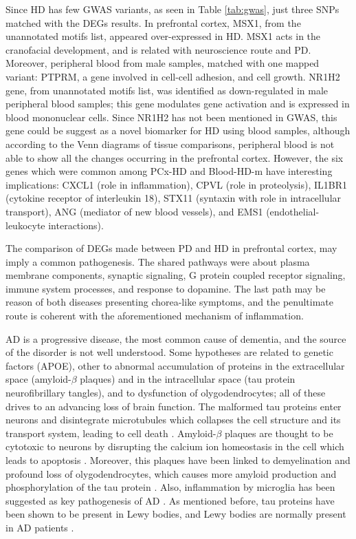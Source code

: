 Since HD has few GWAS variants, as seen in Table \ref{tab:gwas}, just three SNPs matched with the DEGs results. In prefrontal cortex, MSX1, from the unannotated motifs list, appeared over-expressed in HD. MSX1 acts in the cranofacial development, and is related with neuroscience route and PD. Moreover, peripheral blood from male samples, matched with one mapped variant: PTPRM, a gene involved in cell-cell adhesion, and cell growth. NR1H2 gene, from unannotated motifs list, was identified as down-regulated in male peripheral blood samples; this gene modulates gene activation and is expressed in blood mononuclear cells. Since NR1H2 has not been mentioned in GWAS, this gene could be suggest as a novel biomarker for HD using blood samples, although according to the Venn diagrams of tissue comparisons, peripheral blood is not able to show all the changes occurring in the prefrontal cortex. However, the six genes which were common among PCx-HD and Blood-HD-m have interesting implications: CXCL1 (role in inflammation), CPVL (role in proteolysis), IL1BR1 (cytokine receptor of interleukin 18), STX11 (syntaxin with role in intracellular transport), ANG (mediator of new blood vessels), and EMS1 (endothelial-leukocyte interactions).

The comparison of DEGs made between PD and HD in prefrontal cortex, may imply a common pathogenesis. The shared pathways were about plasma membrane components, synaptic signaling, G protein coupled receptor signaling, immune system processes, and response to dopamine. The last path may be reason of both diseases presenting chorea-like symptoms, and the penultimate route is coherent with the aforementioned mechanism of inflammation. 

AD is a progressive disease, the most common cause of dementia, and the source of the disorder is not well understood. Some hypotheses are related to genetic factors (APOE), other to abnormal accumulation of proteins in the extracellular space (amyloid-$\beta$ plaques) and in the intracellular space (tau protein neurofibrillary tangles), and to dysfunction of olygodendrocytes; all of these drives to an advancing loss of brain function. The malformed tau proteins enter neurons and disintegrate microtubules which collapses the cell structure and its transport system, leading to cell death \cite{iqbal}. Amyloid-$\beta$ plaques are thought to be cytotoxic to neurons by disrupting the calcium ion homeostasis in the cell which leads to apoptosis \cite{yankner}. Moreover, this plaques have been linked to demyelination and profound loss of olygodendrocytes, which causes more amyloid production and phosphorylation of the tau protein \cite{mitew}. Also, inflammation by microglia has been suggested as key pathogenesis of AD \cite{leng}. As mentioned before, tau proteins have been shown to be present in Lewy bodies, and Lewy bodies are normally present in AD patients \cite{kotzbauer}.

